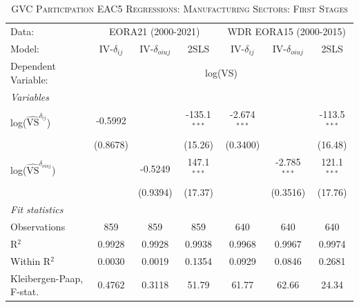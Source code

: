 \documentclass[a4paper]{article}
\begin{document}
\begin{table}[h!]
   \caption{\label{tab:MS_RES_F1} \textsc{GVC Participation EAC5 Regressions: Manufacturing Sectors: First Stages}}
   \centering
     \begin{tabular}{lcccccc}
       \tabularnewline \toprule
      Data: & \multicolumn{3}{c}{EORA21 (2000-2021)} & \multicolumn{3}{c}{WDR EORA15 (2000-2015)} \\ \cmidrule(lr){2-4} \cmidrule(lr){5-7}
      Model:                   & IV-$\delta_{ij}$      & IV-$\delta_{oiuj}$    & 2SLS              & IV-$\delta_{ij}$      & IV-$\delta_{oiuj}$    & 2SLS\\  
      \midrule
            Dependent Variable: & \multicolumn{6}{c}{log(VS)}\\ \cmidrule(lr){2-7}
      \emph{Variables}\\
      log($\hat{\text{VS}}^{\delta_{ij}}$)       & -0.5992               &                        & -135.1$^{***}$         & -2.674$^{***}$         &                        & -113.5$^{***}$\\   
                                & (0.8678)              &                        & (15.26)                & (0.3400)               &                        & (16.48)\\     
      log($\hat{\text{VS}}^{\delta_{oiuj}}$)             &                       & -0.5249                & 147.1$^{***}$          &                        & -2.785$^{***}$         & 121.1$^{***}$\\    
                                 &                       & (0.9394)               & (17.37)                &                        & (0.3516)               & (17.76)\\
      \emph{Fit statistics}\\
     Observations              & 859                   & 859                    & 859                    & 640                    & 640                    & 640\\  
      R$^2$                     & 0.9928                & 0.9928                 & 0.9938                 & 0.9968                 & 0.9967                 & 0.9974\\  
      Within R$^2$              & 0.0030                & 0.0019                 & 0.1354                 & 0.0929                 & 0.0846                 & 0.2681\\  
      Kleibergen-Paap, F-stat.     & 0.4762                & 0.3118                 & 51.79                  & 61.77                  & 62.66                  & 24.34\\    

\end{tabular}
\end{table}
\end{document}
